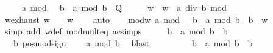 \begin{isabellebody}
\ \ \ \ \ {\isachardoublequoteopen}a\ mod\ {\isacharparenleft}{\kern0pt}{}\ {\isacharasterisk}{\kern0pt}\ b{\isacharparenright}{\kern0pt}\ {\isacharequal}{\kern0pt}\ a\ mod\ b{\isachardoublequoteclose}\ {\isacharparenleft}{\kern0pt}\ {\isachardoublequoteopen}{\isacharquery}{\kern0pt}Q{\isachardoublequoteclose}{\isacharparenright}{\kern0pt}\isanewline
%
\isadelimproof
%
\endisadelimproof
%
\isatagproof
{}\isamarkupfalse%
\ {\isacharminus}{\kern0pt}\isanewline
\ \ \isamarkupfalse%
\ w\ \ {\isachardoublequoteopen}w\ {\isacharequal}{\kern0pt}\ a\ div\ b\ mod\ {}{\isachardoublequoteclose}\isanewline
\ \ \isamarkupfalse%
\ \isamarkupfalse%
\ w{\isacharunderscore}{\kern0pt}exhaust{\isacharcolon}{\kern0pt}\ {\isachardoublequoteopen}w\ {\isacharequal}{\kern0pt}\ {}\ {\isasymor}\ w\ {\isacharequal}{\kern0pt}\ {}{\isachardoublequoteclose}\ \isamarkupfalse%
\ auto\isanewline
\ \ \isamarkupfalse%
\ mod{\isacharunderscore}{\kern0pt}w{\isacharcolon}{\kern0pt}\ {\isachardoublequoteopen}a\ mod\ {\isacharparenleft}{\kern0pt}{}\ {\isacharasterisk}{\kern0pt}\ b{\isacharparenright}{\kern0pt}\ {\isacharequal}{\kern0pt}\ a\ mod\ b\ {\isacharplus}{\kern0pt}\ b\ {\isacharasterisk}{\kern0pt}\ w{\isachardoublequoteclose}\isanewline
\ \ \ \ \isamarkupfalse%
\ {\isacharparenleft}{\kern0pt}simp\ add{\isacharcolon}{\kern0pt}\ w{\isacharunderscore}{\kern0pt}def\ mod{\isacharunderscore}{\kern0pt}mult{}{\isacharunderscore}{\kern0pt}eq\ ac{\isacharunderscore}{\kern0pt}simps{\isacharparenright}{\kern0pt}\isanewline
\ \ \isamarkupfalse%
\ \isamarkupfalse%
\ {\isachardoublequoteopen}b\ {\isasymle}\ a\ mod\ b\ {\isacharplus}{\kern0pt}\ b{\isachardoublequoteclose}\isanewline
\ \ \isamarkupfalse%
\ {\isacharminus}{\kern0pt}\isanewline
\ \ \ \ \isamarkupfalse%
\ {\isacartoucheopen}{}\ {\isacharless}{\kern0pt}\ b{\isacartoucheclose}\ pos{\isacharunderscore}{\kern0pt}mod{\isacharunderscore}{\kern0pt}sign\ \isamarkupfalse%
\ {\isachardoublequoteopen}{}\ {\isasymle}\ a\ mod\ b{\isachardoublequoteclose}\ \isamarkupfalse%
\ blast\isanewline
\ \ \ \ \isamarkupfalse%
\ \isamarkupfalse%
\ {\isachardoublequoteopen}{}\ {\isacharplus}{\kern0pt}\ b\ {\isasymle}\ a\ mod\ b\ {\isacharplus}{\kern0pt}\ b{\isachardoublequoteclose}\ \isamarkupfalse%

\end{isabellebody}
